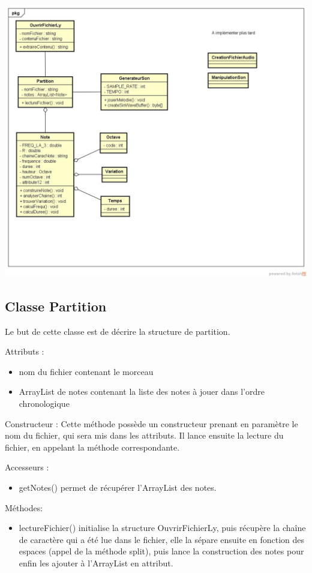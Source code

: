 \documentclass{EPUProjetPeiP}
\begin{document}
\includegraphics[scale=0.4]{Class_Diagram_MusicalSynth.jpg}
\label{fig1}
\subsection{Classe Partition}

Le but de cette classe est de décrire la structure de partition.

Attributs :
\begin{itemize}
\item nom du fichier contenant le morceau
\item ArrayList de notes contenant la liste des notes à jouer dans l'ordre chronologique
\end{itemize}

Constructeur :
Cette méthode possède un constructeur prenant en paramètre le nom du fichier, qui sera mis dans les attributs.
Il lance ensuite la lecture du fichier, en appelant la méthode correspondante.

Accesseurs :
\begin{itemize}
\item getNotes() permet de récupérer l'ArrayList des notes.
\end{itemize}


Méthodes:
\begin{itemize}
\item lectureFichier() initialise la structure OuvrirFichierLy, puis récupère la chaîne de caractère qui a été lue dans le fichier, elle la sépare ensuite en fonction des espaces (appel de la méthode split), puis lance la construction des notes pour enfin les ajouter à l'ArrayList en attribut.
\end{itemize}
\end{document}
